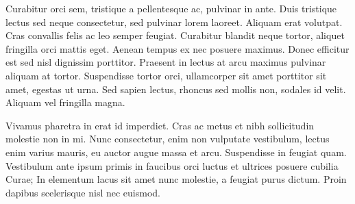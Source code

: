 \documentclass{article}
\begin{document}
Curabitur orci sem, tristique a pellentesque ac, pulvinar in ante. Duis tristique lectus sed neque consectetur, sed pulvinar lorem laoreet. Aliquam erat volutpat. Cras convallis felis ac leo semper feugiat. Curabitur blandit neque tortor, aliquet fringilla orci mattis eget. Aenean tempus ex nec posuere maximus. Donec efficitur est sed nisl dignissim porttitor. Praesent in lectus at arcu maximus pulvinar aliquam at tortor. Suspendisse tortor orci, ullamcorper sit amet porttitor sit amet, egestas ut urna. Sed sapien lectus, rhoncus sed mollis non, sodales id velit. Aliquam vel fringilla magna.

Vivamus pharetra in erat id imperdiet. Cras ac metus et nibh sollicitudin molestie non in mi. Nunc consectetur, enim non vulputate vestibulum, lectus enim varius mauris, eu auctor augue massa et arcu. Suspendisse in feugiat quam. Vestibulum ante ipsum primis in faucibus orci luctus et ultrices posuere cubilia Curae; In elementum lacus sit amet nunc molestie, a feugiat purus dictum. Proin dapibus scelerisque nisl nec euismod.
\end{document}
